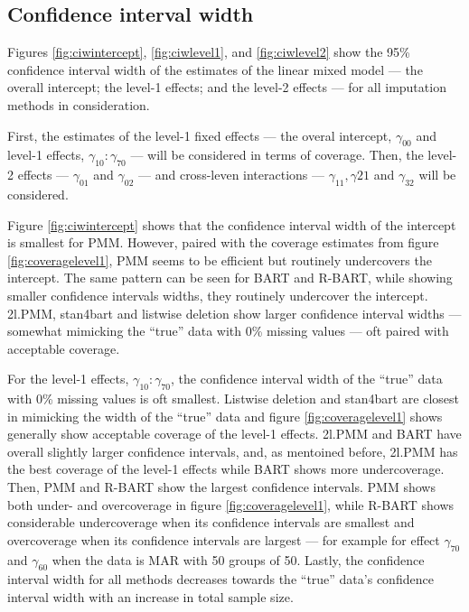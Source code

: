 \documentclass[3p,12pt,a4paper]{elsarticle}
\begin{document}
\subsection{Confidence interval width}
Figures \ref{fig:ciwintercept}, \ref{fig:ciwlevel1}, and \ref{fig:ciwlevel2} show the 95\% confidence interval width of the estimates of the linear mixed model --- the overall intercept; the level-1 effects; and the level-2 effects --- for all imputation methods in consideration.

First, the estimates of the level-1 fixed effects --- the overal intercept, $\gamma_{00}$ and level-1 effects, $\gamma_{10}:\gamma_{70}$ --- will be considered in terms of coverage. Then, the level-2 effects --- $\gamma_{01}$ and $\gamma_{02}$ --- and cross-leven interactions --- $\gamma_{11}, \gamma{21}$ and $\gamma_{32}$ will be considered.

Figure \ref{fig:ciwintercept} shows that the confidence interval width of the intercept is smallest for PMM. However, paired with the coverage estimates from figure \ref{fig:coveragelevel1}, PMM seems to be efficient but routinely undercovers the intercept. The same pattern can be seen for BART and R-BART, while showing smaller confidence intervals widths, they routinely undercover the intercept. 2l.PMM, stan4bart and listwise deletion show larger confidence interval widths --- somewhat mimicking the ``true'' data with 0\% missing values --- oft paired with acceptable coverage.


For the level-1 effects, $\gamma_{10}:\gamma_{70}$, the confidence interval width of the ``true'' data with 0\% missing values is oft smallest. Listwise deletion and stan4bart are closest in mimicking the width of the ``true'' data and figure \ref{fig:coveragelevel1} shows generally show acceptable coverage of the level-1 effects. 2l.PMM and BART have overall slightly larger confidence intervals, and, as mentoined before, 2l.PMM has the best coverage of the level-1 effects while BART shows more undercoverage. Then, PMM and R-BART show the largest confidence intervals. PMM shows both under- and overcoverage in figure \ref{fig:coveragelevel1}, while R-BART shows considerable undercoverage when its confidence intervals are smallest and overcoverage when its confidence intervals are largest --- for example for effect $\gamma_{70}$ and $\gamma_{60}$ when the data is MAR with 50 groups of 50. Lastly, the confidence interval width for all methods decreases towards the ``true'' data's confidence interval width with an increase in total sample size. 
\end{document}
